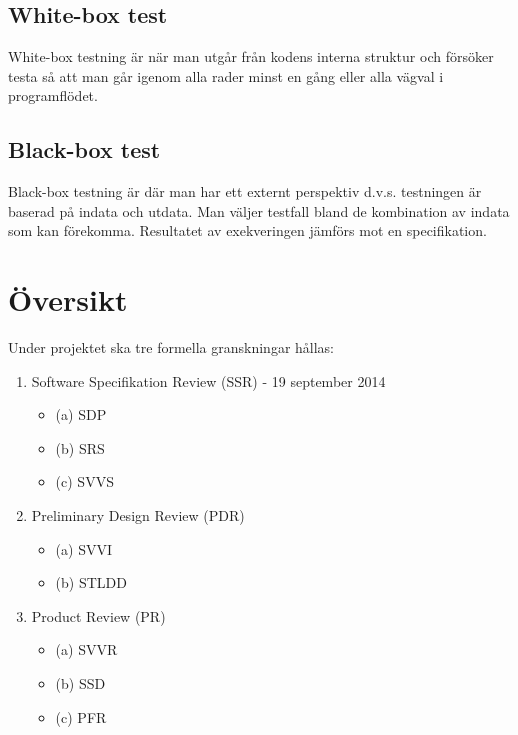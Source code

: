 \documentclass[a4paper]{article}
\begin{document}
\subsection{White-box test}

White-box testning är när man utgår från kodens interna struktur och försöker testa så att man går igenom alla rader minst en gång eller alla vägval i programflödet.

\subsection{Black-box test}

Black-box testning är där man har ett externt perspektiv d.v.s. testningen är baserad på indata och utdata. Man väljer testfall bland de kombination av indata som kan förekomma. Resultatet av exekveringen jämförs mot en specifikation.


\section{Översikt}

Under projektet ska tre formella granskningar hållas:

\begin{enumerate}


\item Software Specifikation Review (SSR) - 19 september 2014
\begin{itemize}
\item [](a) SDP
\item [](b) SRS
\item [](c) SVVS
\end{itemize}


\item Preliminary Design Review (PDR)
\begin{itemize}
\item [](a) SVVI
\item [](b) STLDD
\end{itemize}


\item Product Review (PR)
\begin{itemize}
\item [](a) SVVR
\item [](b) SSD
\item [](c) PFR
\end{itemize}


\end{enumerate}
\end{document}
